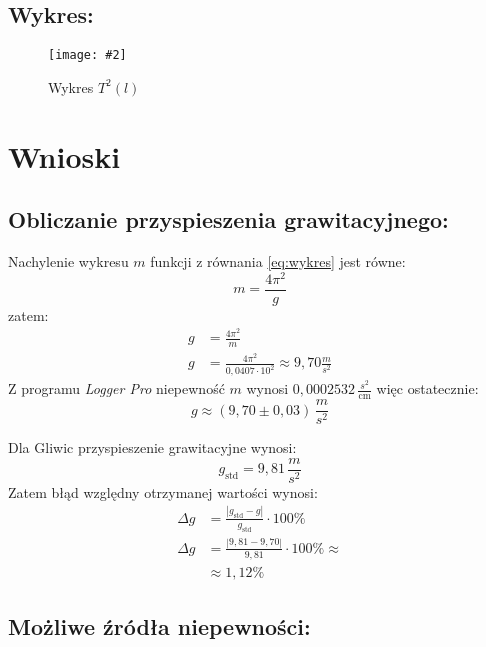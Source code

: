 \documentclass[a4paper,12pt]{article}
\newcommand{\obrazek}[3]{
	\begin{figure}[h]
		\centering
		\texttt{[image: \#2]}
		\caption{#3}
	\end{figure}
}
\begin{document}
\subsection*{Wykres:}
\obrazek{0.55}{wykres}{Wykres $T^2 \left(l \right)$}

\section{Wnioski}
\subsection*{Obliczanie przyspieszenia grawitacyjnego:}

Nachylenie wykresu $m$ funkcji z równania \ref{eq:wykres} jest równe:
\[m = \frac{4\pi^2}{g} \]
zatem:
\begin{align*}
		g &= \frac{4\pi^2}{m}\\
		g &= \frac{4\pi^2}{0,0407 \cdot 10^2} \approx 9,70 \frac{m}{s^2}
\end{align*}
Z programu \emph{Logger Pro} niepewność $m$ wynosi $0,0002532 \, \frac{s^2}{\text{cm}}$ więc ostatecznie:
\[ g \approx \left( 9,70 \pm 0,03 \right) \, \frac{m}{s^2} \]

Dla Gliwic przyspieszenie grawitacyjne wynosi:
\[ g_{\text{std}} = 9,81 \, \frac{m}{s^2}\]
Zatem błąd względny otrzymanej wartości wynosi:
\begin{align*}
		\Delta g &= \frac{\left|g_{\text{std}} - g\right|}{g_{\text{std}}} \cdot 100 \text{\%} \\
		\Delta g &= \frac{| 9,81 - 9,70|}{9,81} \cdot 100 \text{\%} \approx\\
		&\approx 1,12 \text{\%}
\end{align*}

\subsection*{Możliwe źródła niepewności:}
\end{document}
